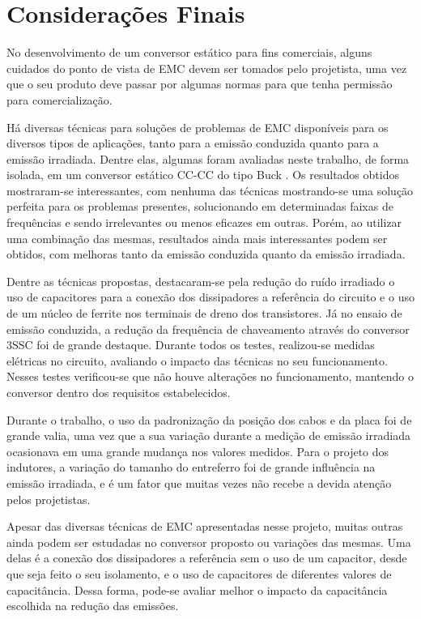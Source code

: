 \chapter{Considerações Finais}
    No desenvolvimento de um conversor estático para fins comerciais, alguns cuidados do ponto de vista de EMC devem ser tomados pelo projetista, uma vez que o seu produto deve passar por algumas normas para que tenha permissão para comercialização. 
    
    Há diversas técnicas para soluções de problemas de EMC disponíveis para os diversos tipos de aplicações, tanto para a emissão conduzida quanto para a emissão irradiada. Dentre elas, algumas foram avaliadas neste trabalho, de forma isolada, em um conversor estático CC-CC do tipo Buck \interleaved. Os resultados obtidos mostraram-se interessantes, com nenhuma das técnicas mostrando-se uma solução perfeita para os problemas presentes, solucionando em determinadas faixas de frequências e sendo irrelevantes ou menos eficazes em outras. Porém, ao utilizar uma combinação das mesmas, resultados ainda mais interessantes podem ser obtidos, com melhoras tanto da emissão conduzida quanto da emissão irradiada. 
    
    Dentre as técnicas propostas, destacaram-se pela redução do ruído irradiado o uso de capacitores para a conexão dos dissipadores a referência do circuito e o uso de um núcleo de ferrite nos terminais de dreno dos transistores. Já no ensaio de emissão conduzida, a redução da frequência de chaveamento através do conversor 3SSC foi de grande destaque. Durante todos os testes, realizou-se medidas elétricas no circuito, avaliando o impacto das técnicas no seu funcionamento. Nesses testes verificou-se que não houve alterações no funcionamento, mantendo o conversor dentro dos requisitos estabelecidos.
    
    Durante o trabalho, o uso da padronização da posição dos cabos e da placa foi de grande valia, uma vez que a sua variação durante a medição de emissão irradiada ocasionava em uma grande mudança nos valores medidos. Para o projeto dos indutores, a variação do tamanho do entreferro foi de grande influência na emissão irradiada, e é um fator que muitas vezes não recebe a devida atenção pelos projetistas. 
    
    Apesar das diversas técnicas de EMC apresentadas nesse projeto, muitas outras ainda podem ser estudadas no conversor proposto ou variações das mesmas. Uma delas é a conexão dos dissipadores a referência sem o uso de um capacitor, desde que seja feito o seu isolamento, e o uso de capacitores de diferentes valores de capacitância. Dessa forma, pode-se avaliar melhor o impacto da capacitância escolhida na redução das emissões. 
    
